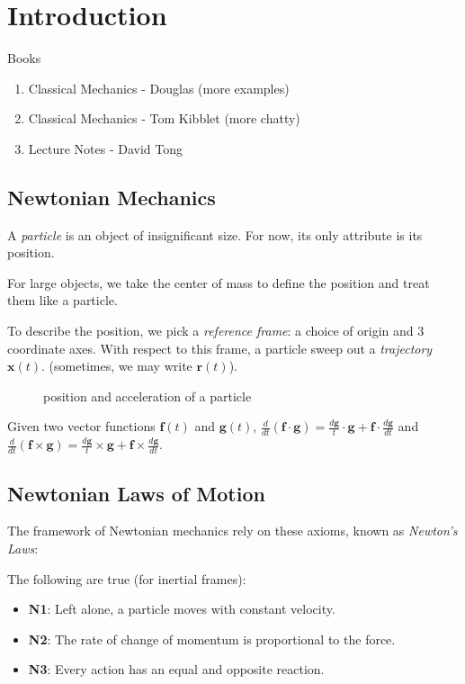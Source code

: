 \section{Introduction}
Books
\begin{enumerate}
    \item Classical Mechanics - Douglas (more examples)
    \item Classical Mechanics - Tom Kibblet (more chatty)
    \item Lecture Notes - David Tong
\end{enumerate}
\subsection{Newtonian Mechanics}
A \textit{particle} is an object of insignificant size. For now, its only attribute is its position.

For large objects, we take the center of mass to define the position and treat them like a particle.

To describe the position, we pick a \textit{reference frame}: a choice of origin and 3 coordinate axes. With respect to this frame, a particle sweep out a \textit{trajectory} $\mathbf{x} (t).$ (sometimes, we may write $\mathbf{r} (t)$).

\begin{figure}[H]
    \centering
    \caption{position and acceleration of a particle}
    \label{fig:va}
\end{figure}

Given two vector functions $\mathbf{f}(t)$ and $\mathbf{g} (t)$, $\frac{d}{dt}(\mathbf{f} \cdot \mathbf{g} ) = \frac{d \mathbf{g} }{t}\cdot \mathbf{g}  + \mathbf{f}  \cdot \frac{d \mathbf{g} }{dt}$ and $\frac{d}{dt}(\mathbf{f} \times \mathbf{g} ) = \frac{d \mathbf{g} }{t}\times \mathbf{g}  + \mathbf{f}  \times \frac{d \mathbf{g} }{dt}$.

\subsection{Newtonian Laws of Motion}
The framework of Newtonian mechanics rely on these axioms, known as \textit{Newton's Laws}:
\begin{definition}
    The following are true (for inertial frames):
\begin{itemize}
    \item \textbf{N1}: Left alone, a particle moves with constant velocity.
    \item \textbf{N2}: The rate of change of momentum is proportional to the force.
    \item \textbf{N3}: Every action has an equal and opposite reaction.
\end{itemize}
\end{definition}
